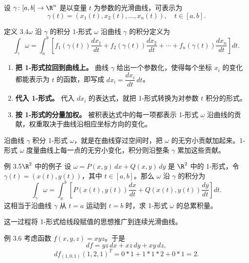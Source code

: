 设 $\gamma\colon[a,b]\to\R^n$ 是以变量 $t$ 为参数的光滑曲线，可表示为
\[
  \gamma(t)=(x_1(t),x_2(t),\dots,x_n(t)),\quad t\in[a,b].
\]

\begin{statement}{定义 3.4}{$\omega$ 沿 $\gamma$ 的积分}
1-形式 $\omega$ 沿曲线 $\gamma$ 的积分定义为
\[
  \int_\gamma\omega=\int_a^b
  \left[f_1(\gamma(t))\frac{dx_1}{dt}
       +f_2(\gamma(t))\frac{dx_2}{dt}
       +\cdots+f_n(\gamma(t))\frac{dx_n}{dt}\right]dt.
\]
\end{statement}

\begin{enumerate}
\item \textbf{把 1-形式拉回到曲线上。} 曲线 $\gamma$ 给出一个参数化，使得每个坐标 $x_i$ 的变化都能表示为 $t$ 的函数，即写成 $dx_i=\dfrac{dx_i}{dt}\,dt$。
\item \textbf{代入 1-形式。} 代入 $dx_i$ 的表达式，就把 1-形式转换为对参数 $t$ 积分的形式。
\item \textbf{按 1-形式的分量加权。} 被积表达式中的每一项都表示 1-形式 $\omega$ 沿曲线的贡献，权重取决于曲线沿相应坐标方向的变化。
\end{enumerate}

沿曲线 $\gamma$ 积分 1-形式 $\omega$，就是在曲线穿过空间时，把 $\omega$ 的无穷小贡献加起来。1-形式 $\omega$ 度量曲线上每一点的无穷小变化，积分则沿整条 $\gamma$ 累加这些贡献。

\begin{statement}{例 3.5}{$\R^2$ 中的例子}
设 $\omega=P(x,y)\,dx+Q(x,y)\,dy$ 是 $\R^2$ 中的 1-形式，令 $\gamma(t)=(x(t),y(t))$，其中 $t\in[a,b]$。那么 $\omega$ 沿 $\gamma$ 的积分为
\[
  \int_\gamma\omega=\int_a^b
  \left[P(x(t),y(t))\frac{dx}{dt}+Q(x(t),y(t))\frac{dy}{dt}\right]dt.
\]
这相当于沿曲线 $\gamma$ 从 $t=a$ 运动到 $t=b$ 时，求 1-形式 $\omega$ 的总累积量。

这一过程将 1-形式给线段赋值的思想推广到连续光滑曲线。
\end{statement}

\begin{statement}{例 3.6}{}
考虑函数 $f(x,y,z)=xyz$。于是
\[
  df=yz\,dx+xz\,dy+xy\,dz,
\]
\[
  df_{(1,0,1)}(1,2,1)^T=0*1+1*1*2+0*1=2.
\]
\end{statement}


